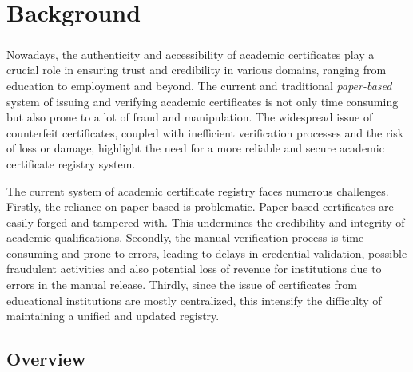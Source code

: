 %
%
\chapter{Background}\label{chap:background}
\paragraph{}

Nowadays, the authenticity and accessibility of academic certificates play a crucial role in ensuring trust and credibility in various
domains, ranging from education to employment and beyond.
The current and traditional \textit{paper-based} system of issuing and verifying academic certificates is not only time consuming but also prone to a lot of fraud and manipulation.
The widespread issue of counterfeit certificates\cite{certCounterfeitAdv, certCounterfeitRid}, coupled with inefficient verification processes and the risk of loss or damage, highlight the need for a more reliable and secure academic certificate registry system.

The current system of academic certificate registry faces numerous challenges. Firstly, the reliance on paper-based is problematic. Paper-based certificates are easily forged and tampered with. This undermines the credibility and integrity of academic qualifications. Secondly, the manual verification process is
time-consuming and prone to errors, leading to delays in credential validation, possible fraudulent activities and also potential loss of revenue for institutions due to
errors in the manual release. Thirdly, since the issue of certificates from educational institutions are mostly centralized, this intensify the difficulty
of maintaining a unified and updated registry.

\section{Overview}\label{sec:overview}
\paragraph{}

